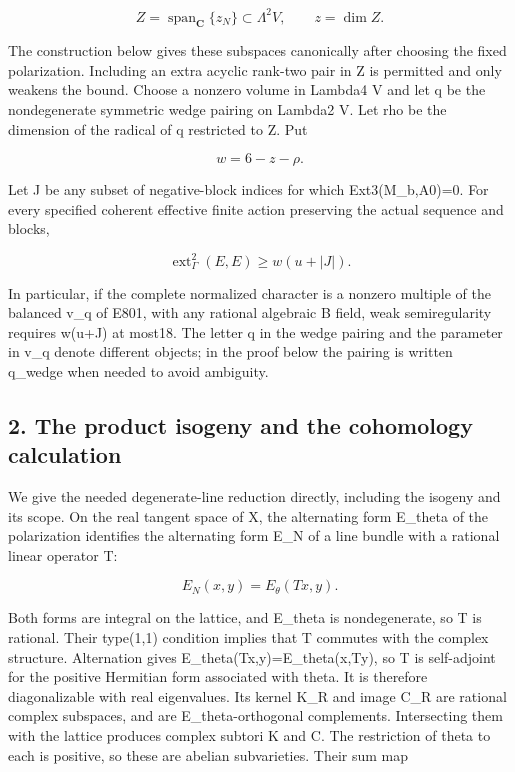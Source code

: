 \[
 Z=\operatorname{span}_\mathbf C\{z_N\}\subset\Lambda^2V,
 \qquad z=\dim Z.
 \tag{E829.2}
\]

The construction below gives these subspaces canonically after choosing the
fixed polarization. Including an extra acyclic rank-two pair in Z is
permitted and only weakens the bound. Choose a nonzero volume in Lambda4 V
and let q be the nondegenerate symmetric wedge pairing on Lambda2 V. Let rho
be the dimension of the radical of q restricted to Z. Put

\[
 w=6-z-\rho.
 \tag{E829.3}
\]

Let J be any subset of negative-block indices for which Ext3(M\_b,A0)=0. For
every specified coherent effective finite action preserving the actual
sequence and blocks,

\[
 \operatorname{ext}^2_\Gamma(E,E)\ge w(u+|J|).
 \tag{E829.4}
\]

In particular, if the complete normalized character is a nonzero multiple of
the balanced v\_q of E801, with any rational algebraic B field, weak
semiregularity requires w(u+\textbar J\textbar) at most18. The letter q in
the wedge pairing and the parameter in v\_q denote different objects; in the
proof below the pairing is written q\_wedge when needed to avoid ambiguity.

\subsection{2. The product isogeny and the cohomology
calculation}\label{SF-E829:the-product-isogeny-and-the-cohomology-calculation}

We give the needed degenerate-line reduction directly, including the isogeny
and its scope. On the real tangent space of X, the alternating form E\_theta
of the polarization identifies the alternating form E\_N of a line bundle
with a rational linear operator T:

\[
 E_N(x,y)=E_\theta(Tx,y).
 \tag{E829.5}
\]

Both forms are integral on the lattice, and E\_theta is nondegenerate, so T
is rational. Their type(1,1) condition implies that T commutes with the
complex structure. Alternation gives E\_theta(Tx,y)=E\_theta(x,Ty), so T is
self-adjoint for the positive Hermitian form associated with theta. It is
therefore diagonalizable with real eigenvalues. Its kernel K\_R and image
C\_R are rational complex subspaces, and are E\_theta-orthogonal
complements. Intersecting them with the lattice produces complex subtori K
and C. The restriction of theta to each is positive, so these are abelian
subvarieties. Their sum map

